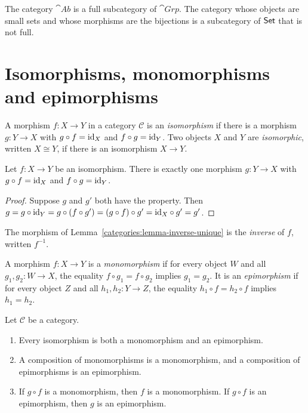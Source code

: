 \begin{example}\label{categories:example-full-subcategory}
The category $\cat{Ab}$ is a full subcategory of $\cat{Grp}$. The category
whose objects are small sets and whose morphisms are the bijections is a
subcategory of $\mathsf{Set}$ that is not full.
\end{example}

\section{Isomorphisms, monomorphisms and epimorphisms}\label{categories:section-morphisms}

\begin{definition}\label{categories:definition-isomorphism}
A morphism $f \colon X \to Y$ in a category $\mathcal{C}$ is an
\emph{isomorphism} if there is a morphism $g \colon Y \to X$ with
$g \circ f = \mathrm{id}_X$ and $f \circ g = \mathrm{id}_Y$. Two objects $X$ and $Y$ are
\emph{isomorphic}, written $X \cong Y$, if there is an isomorphism
$X \to Y$.
\end{definition}

\begin{lemma}\label{categories:lemma-inverse-unique}
Let $f \colon X \to Y$ be an isomorphism. There is exactly one morphism
$g \colon Y \to X$ with $g \circ f = \mathrm{id}_X$ and $f \circ g = \mathrm{id}_Y$.
\end{lemma}

\begin{proof}
Suppose $g$ and $g'$ both have the property. Then
$g = g \circ \mathrm{id}_Y = g \circ (f \circ g') = (g \circ f) \circ g'
= \mathrm{id}_X \circ g' = g'$.
\end{proof}

\begin{notation}\label{categories:notation-inverse}
The morphism of Lemma~\ref{categories:lemma-inverse-unique} is the
\emph{inverse} of $f$, written $f^{-1}$.
\end{notation}

\begin{definition}\label{categories:definition-mono-epi}
A morphism $f \colon X \to Y$ is a \emph{monomorphism} if for every object $W$
and all $g_1, g_2 \colon W \to X$, the equality $f \circ g_1 = f \circ g_2$
implies $g_1 = g_2$. It is an \emph{epimorphism} if for every object $Z$ and
all $h_1, h_2 \colon Y \to Z$, the equality $h_1 \circ f = h_2 \circ f$
implies $h_1 = h_2$.
\end{definition}

\begin{lemma}\label{categories:lemma-mono-epi}
Let $\mathcal{C}$ be a category.
\begin{enumerate}
\item Every isomorphism is both a monomorphism and an epimorphism.
\item A composition of monomorphisms is a monomorphism, and a composition of
epimorphisms is an epimorphism.
\item If $g \circ f$ is a monomorphism, then $f$ is a monomorphism. If
$g \circ f$ is an epimorphism, then $g$ is an epimorphism.
\end{enumerate}
\end{lemma}

